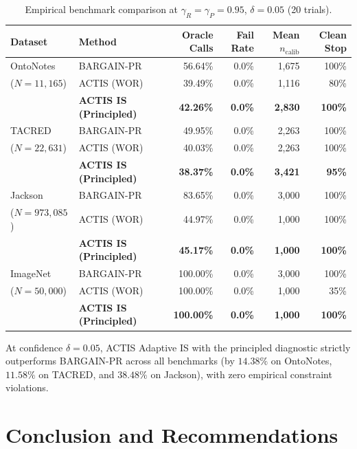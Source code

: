 \documentclass[11pt,a4paper]{article}
\begin{document}
\begin{table}[ht]
\centering
\small
\setlength{\tabcolsep}{5pt}
\caption{Empirical benchmark comparison at $\gamma_R = \gamma_P = 0.95$, $\delta = 0.05$ (20 trials).}\label{tab:results_delta_05}
\begin{tabular*}{\textwidth}{@{\extracolsep{\fill}}llrrrr}
\toprule
Dataset & Method & Oracle Calls & Fail Rate & Mean $n_{\text{calib}}$ & Clean Stop \\
\midrule
OntoNotes & BARGAIN-PR & 56.64\% & 0.0\% & 1,675 & 100\% \\
($N=11,165$) & ACTIS (WOR) & 39.49\% & 0.0\% & 1,116 & 80\% \\
 & \textbf{ACTIS IS (Principled)} & \textbf{42.26\%} & \textbf{0.0\%} & \textbf{2,830} & \textbf{100\%} \\
\midrule
TACRED & BARGAIN-PR & 49.95\% & 0.0\% & 2,263 & 100\% \\
($N=22,631$) & ACTIS (WOR) & 40.03\% & 0.0\% & 2,263 & 100\% \\
 & \textbf{ACTIS IS (Principled)} & \textbf{38.37\%} & \textbf{0.0\%} & \textbf{3,421} & \textbf{95\%} \\
\midrule
Jackson & BARGAIN-PR & 83.65\% & 0.0\% & 3,000 & 100\% \\
($N=973,085$) & ACTIS (WOR) & 44.97\% & 0.0\% & 1,000 & 100\% \\
 & \textbf{ACTIS IS (Principled)} & \textbf{45.17\%} & \textbf{0.0\%} & \textbf{1,000} & \textbf{100\%} \\
\midrule
ImageNet & BARGAIN-PR & 100.00\% & 0.0\% & 3,000 & 100\% \\
($N=50,000$) & ACTIS (WOR) & 100.00\% & 0.0\% & 1,000 & 35\% \\
 & \textbf{ACTIS IS (Principled)} & \textbf{100.00\%} & \textbf{0.0\%} & \textbf{1,000} & \textbf{100\%} \\
\bottomrule
\end{tabular*}
\end{table}

At confidence $\delta = 0.05$, ACTIS Adaptive IS with the principled diagnostic strictly outperforms BARGAIN-PR across all benchmarks (by $14.38\%$ on OntoNotes, $11.58\%$ on TACRED, and $38.48\%$ on Jackson), with zero empirical constraint violations.

\newpage
\section{Conclusion and Recommendations}
\end{document}
